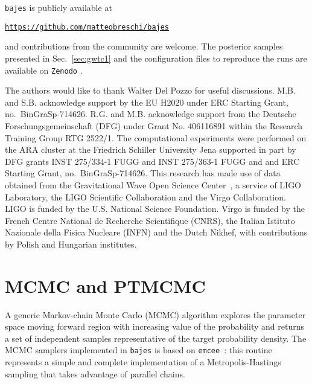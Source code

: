 \documentclass[prd,aps,twocolumn,a4paper,showkeys,nofootinbib,floatfix]{revtex4-1}
\newcommand{\bajes}{{\tt bajes}}
\begin{document}
{\bajes} is publicly available at
\begin{center}
\href{https://github.com/matteobreschi/bajes}{\tt https://github.com/matteobreschi/bajes}
\end{center}
and contributions from the community are welcome.
The posterior samples presented in Sec.~\ref{sec:gwtc1}
and the configuration files to reproduce
the runs are available on {\tt Zenodo} \cite{zenodo_cite_doi}.

\begin{acknowledgments}
   The authors would like to thank Walter Del Pozzo for useful discussions.
  M.B. and S.B. acknowledge support by the EU H2020 under ERC Starting
  Grant, no.~BinGraSp-714626.  
  R.G. and M.B. acknowledge support from the Deutsche Forschungsgemeinschaft
  (DFG) under Grant No. 406116891 within the Research Training Group
  RTG 2522/1.
  The computational experiments were performed on the ARA cluster at
  the Friedrich Schiller University Jena supported in part by DFG grants INST
  275/334-1 FUGG and INST 275/363-1 FUGG and and ERC Starting Grant,
  no.~BinGraSp-714626.
  This research has made use of data obtained from the Gravitational
  Wave Open Science Center~\cite{gwosc}, a
  service of LIGO Laboratory, the LIGO Scientific Collaboration and
  the Virgo Collaboration. LIGO is funded by the U.S. National Science
  Foundation. Virgo is funded by the French Centre National de
  Recherche Scientifique (CNRS), the Italian Istituto Nazionale della
  Fisica Nucleare (INFN) and the Dutch Nikhef, with contributions by
  Polish and Hungarian institutes. 
\end{acknowledgments}

\appendix

\section{MCMC and PTMCMC} 
\label{app:mcmc}

A generic Markov-chain Monte Carlo (MCMC) 
algorithm explores the parameter space moving forward region
with increasing value of the probability
and returns a set of independent samples  
representative of the target probability density.
The MCMC samplers implemented in {\bajes} 
is based on {\tt emcee}~\cite{Foreman_Mackey_2013}:
this routine represents a simple and complete
implementation of a Metropolis-Hastings sampling 
that takes advantage of parallel chains.
\end{document}
